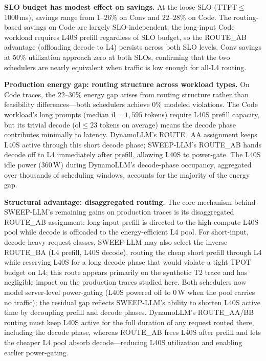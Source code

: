 \textbf{SLO budget has modest effect on savings.}
At the loose SLO (TTFT$\leq$1000\,ms), savings range from $1$--$26\%$ on Conv and $22$--$28\%$ on Code.
The routing-based savings on Code are largely SLO-independent: the long-input Code workload requires L40S prefill regardless of SLO budget, so the ROUTE\_AB advantage (offloading decode to L4) persists across both SLO levels.
Conv savings at 50\% utilization approach zero at both SLOs, confirming that the two schedulers are nearly equivalent when traffic is low enough for all-L4 routing.

\textbf{Production energy gap: routing structure across workload types.}
On Code traces, the $22$--$30\%$ energy gap arises from routing structure rather than feasibility differences---both schedulers achieve $0\%$ modeled violations.
The Code workload's long prompts (median $\mathrm{il}{=}1{,}595$ tokens) require L40S prefill capacity, but its trivial decode ($\mathrm{ol}{\leq}23$ tokens on average) means the decode phase contributes minimally to latency.
DynamoLLM's ROUTE\_AA assignment keeps L40S active through this short decode phase; SWEEP-LLM's ROUTE\_AB hands decode off to L4 immediately after prefill, allowing L40S to power-gate.
The L40S idle power ($360$\,W) during DynamoLLM's decode-phase occupancy, aggregated over thousands of scheduling windows, accounts for the majority of the energy gap.

\textbf{Structural advantage: disaggregated routing.}
The core mechanism behind SWEEP-LLM's remaining gains on production traces is its disaggregated ROUTE\_AB assignment: long-input prefill is directed to the high-compute L40S pool while decode is offloaded to the energy-efficient L4 pool.
For short-input, decode-heavy request classes, SWEEP-LLM may also select the inverse ROUTE\_BA (L4 prefill, L40S decode), routing the cheap short prefill through L4 while reserving L40S for a long decode phase that would violate a tight TPOT budget on L4; this route appears primarily on the synthetic T2 trace and has negligible impact on the production traces studied here.
Both schedulers now model server-level power-gating (L40S powered off to 0\,W when the pool carries no traffic); the residual gap reflects SWEEP-LLM's ability to shorten L40S active time by decoupling prefill and decode phases.
DynamoLLM's ROUTE\_AA/BB routing must keep L40S active for the full duration of any request routed there, including the decode phase, whereas ROUTE\_AB frees L40S after prefill and lets the cheaper L4 pool absorb decode---reducing L40S utilization and enabling earlier power-gating.

